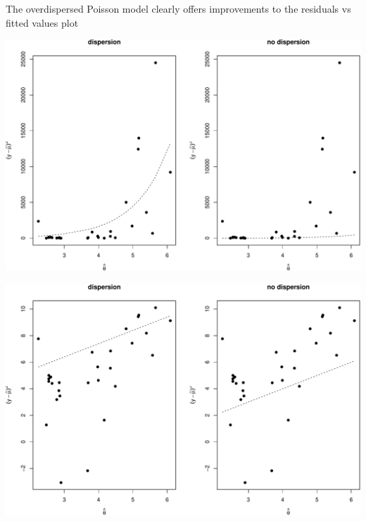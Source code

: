 \documentclass[
  ignorenonframetext,
]{beamer}
\begin{document}
\begin{frame}{}
\protect\hypertarget{section-6}{}
The overdispersed Poisson model clearly offers improvements to the
residuals vs fitted values plot

\vspace{12pt}
\tiny

\includegraphics{week5_p2_files/figure-beamer/unnamed-chunk-6-1.pdf}
\end{frame}

\begin{frame}{}
\protect\hypertarget{section-7}{}
\includegraphics{week5_p2_files/figure-beamer/unnamed-chunk-7-1.pdf}
\end{frame}
\end{document}
